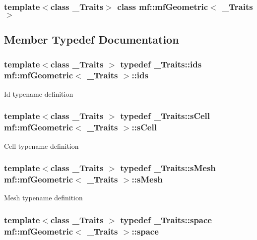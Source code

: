 \subsubsection*{template$<$class \_\-Traits$>$ class mf::mfGeometric$<$ \_\-Traits $>$}



\subsection{Member Typedef Documentation}
\hypertarget{classmf_1_1mfGeometric_a15bbb64e3b03482d20c82fa2d4b68e56}{
\subsubsection[{ids}]{\setlength{\rightskip}{0pt plus 5cm}template$<$class \_\-Traits $>$ typedef \_\-Traits::ids {\bf mf::mfGeometric}$<$ \_\-Traits $>$::{\bf ids}}}
\label{classmf_1_1mfGeometric_a15bbb64e3b03482d20c82fa2d4b68e56}
Id typename definition \hypertarget{classmf_1_1mfGeometric_a59004ce8cd63aa64c7a6ce66eb6f0080}{
\subsubsection[{sCell}]{\setlength{\rightskip}{0pt plus 5cm}template$<$class \_\-Traits $>$ typedef \_\-Traits::sCell {\bf mf::mfGeometric}$<$ \_\-Traits $>$::{\bf sCell}}}
\label{classmf_1_1mfGeometric_a59004ce8cd63aa64c7a6ce66eb6f0080}
Cell typename definition \hypertarget{classmf_1_1mfGeometric_a36b13b57c06fda7c04e3202ad1dae4d2}{
\subsubsection[{sMesh}]{\setlength{\rightskip}{0pt plus 5cm}template$<$class \_\-Traits $>$ typedef \_\-Traits::sMesh {\bf mf::mfGeometric}$<$ \_\-Traits $>$::{\bf sMesh}}}
\label{classmf_1_1mfGeometric_a36b13b57c06fda7c04e3202ad1dae4d2}
Mesh typename definition \hypertarget{classmf_1_1mfGeometric_a03504b73c011add763229b5bae6e137c}{
\subsubsection[{space}]{\setlength{\rightskip}{0pt plus 5cm}template$<$class \_\-Traits $>$ typedef \_\-Traits::space {\bf mf::mfGeometric}$<$ \_\-Traits $>$::{\bf space}}}
